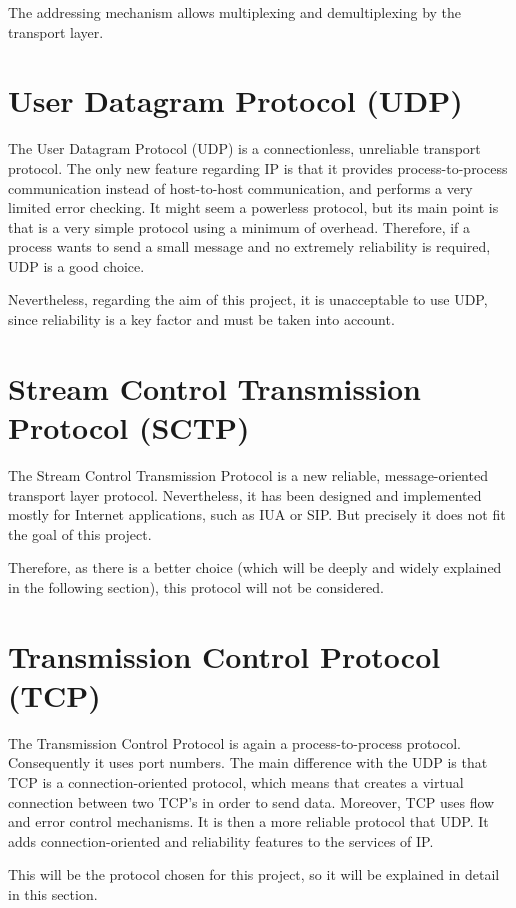 \documentclass[12pt,a4paper]{report}
\begin{document}
The addressing mechanism allows multiplexing and demultiplexing by the transport layer.
	

\section{User Datagram Protocol (UDP)}
The User Datagram Protocol (UDP) is a connectionless, unreliable transport protocol. The only new feature regarding IP is that it provides process-to-process communication instead of host-to-host communication, and performs a very limited error checking. It might seem a powerless protocol, but its main point is that is a very simple protocol using a minimum of overhead. Therefore, if a process wants to send a small message and no extremely reliability is required, UDP is a good choice. 

Nevertheless, regarding the aim of this project, it is unacceptable to use UDP, since reliability is a key factor and must be taken into account.

\section{Stream Control Transmission Protocol (SCTP)}
The Stream Control Transmission Protocol is a new reliable, message-oriented transport layer protocol. Nevertheless, it has been designed and implemented mostly for Internet applications, such as IUA or SIP. But precisely it does not fit the goal of this project. 

Therefore, as there is a better choice (which will be deeply and widely explained in the following section), this protocol will not be considered. 


\section{ Transmission Control Protocol (TCP)}
The Transmission Control Protocol is again a process-to-process protocol. Consequently it uses port numbers. The main difference with the UDP is that TCP is a connection-oriented protocol, which means that creates a virtual connection between two TCP's in order to send data. Moreover, TCP uses flow and error control mechanisms. It is then a more reliable protocol that UDP. It adds connection-oriented and reliability features to the services of IP.

This will be the protocol chosen for this project, so it will be explained in detail in this section. 
\end{document}
